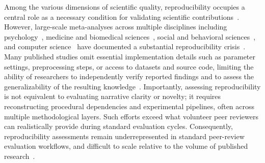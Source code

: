 \documentclass{article}
\begin{document}
Among the various dimensions of scientific quality, reproducibility occupies a central role as a necessary condition for validating scientific contributions~\citep{popperDE,popperEN}. 
However, large-scale meta-analyses across multiple disciplines including psychology~\citep{anvari2018replicability}, medicine and biomedical sciences~\citep{errington2014open,stupple2019reproducibility,miyakawa2020no}, social and behavioral sciences~\citep{fivsar2024reproducibility,tyner2026investigating}, and computer science~\citep{hutson2018artificial,riehl2025revisiting} have documented a substantial reproducibility crisis~\citep{baker2016reproducibility,fanelli2018science}.
Many published studies omit essential implementation details such as parameter settings, preprocessing steps, or access to datasets and source code, limiting the ability of researchers to independently verify reported findings and to assess the generalizability of the resulting knowledge~\citep{stark2018before}.
Importantly, assessing reproducibility is not equivalent to evaluating narrative clarity or novelty; it requires reconstructing procedural dependencies and experimental pipelines, often across multiple methodological layers. 
Such efforts exceed what volunteer peer reviewers can realistically provide during standard evaluation cycles. 
Consequently, reproducibility assessments remain underrepresented in standard peer-review evaluation workflows, and difficult to scale relative to the volume of published research~\citep{national2019reproducibility}.
\end{document}

